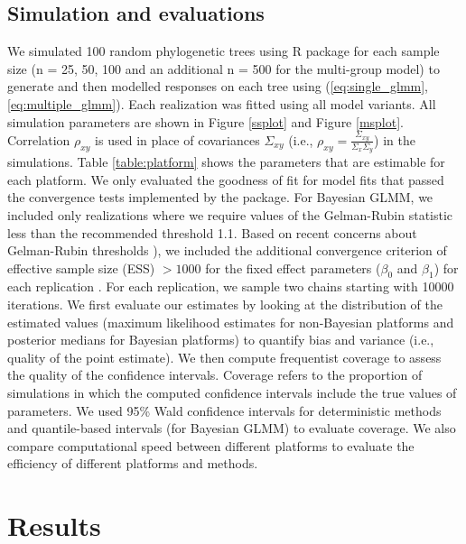 \documentclass[12pt]{article}
\begin{document}
\subsection*{Simulation and evaluations}

We simulated 100 random phylogenetic trees using R package  \citep{ape} for each sample size (n = 25, 50, 100 and an additional n = 500 for the multi-group model) to generate and then modelled responses on each tree using (\ref{eq:single_glmm}, \ref{eq:multiple_glmm}). 
Each realization was fitted using all model variants. 
All simulation parameters are shown in Figure \ref{ssplot} and Figure \ref{msplot}. 
Correlation $\rho_{xy}$ is used in place of covariances $\Sigma_{xy}$ (i.e., $\rho_{xy} = \frac{\Sigma_{xy}}{\Sigma_{x}\Sigma_{y}}$) in the simulations.
Table \ref{table:platform} shows the parameters that are estimable for each platform. 
We only evaluated the goodness of fit for model fits that passed the convergence tests implemented by the package.
For Bayesian GLMM, we included only realizations where we require values of the Gelman-Rubin statistic less than the recommended threshold 1.1. Based on recent concerns about Gelman-Rubin thresholds \citep{vats2018revisiting}), we included the additional convergence criterion of effective sample size (ESS) $>1000$ for the fixed effect parameters ($\beta_{0}$ and $\beta_{1}$) for each replication \citep{vehtari2019rank}. 
For each replication, we sample two chains starting with 10000 iterations. 
We first evaluate our estimates by looking at the distribution of the estimated values (maximum likelihood estimates for non-Bayesian platforms and posterior medians for Bayesian platforms) to quantify bias and variance (i.e., quality of the point estimate).
We then compute frequentist coverage to assess the quality of the confidence intervals.
Coverage refers to the proportion of simulations in which the computed confidence intervals include the true values of parameters.
We used 95\% Wald confidence intervals for deterministic methods and quantile-based intervals (for Bayesian GLMM) to evaluate coverage.
We also compare computational speed between different platforms to evaluate the efficiency of different platforms and methods. 

\section*{Results}
\end{document}
